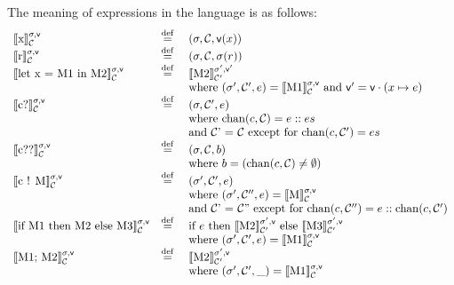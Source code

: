 \documentclass{article}
\newcommand{\m}[1]{\ensuremath{\llbracket #1\rrbracket}}
\begin{document}
The meaning of expressions in the language is as follows:
\[
\begin{array}{lcl}
  \m{\text{x}}^{\state, \envir}_\channels &\defn{} & (\state, \channels, \envir(x))\\
  \m{\text{r}}^{\state, \envir}_\channels &\defn{} & (\state, \channels, \state(r))\\
  \m{\text{let x = M1 in M2}}^{\state, \envir}_\channels & \defn{} &
  \m{\text{M2}}^{\state', \envir'}_{\channels'} \\
  && \text{where $(\state', \channels', e) = \m{\text{M1}}^{\state,
  \envir}_{\channels}$ and $\envir' = \envir \cdot (x \mapsto e)$} \\

  \m{\text{c?}}^{\state, \envir}_\channels & \defn{} &
    (\state, \channels', e)\\
    && \text{where $\mathrm{chan}(c, \channels) = e :: es$}\\
    && \text{and \channels' =
    \channels\ except for $\mathrm{chan}(c, \channels') = es$}\\

  \m{\text{c??}}^{\state, \envir}_\channels & \defn{} &
    (\state, \channels, b)\\
    && \text{where $b = (\mathrm{chan}(c, \channels) \neq \emptyset)$}\\

  \m{\text{c ! M}}^{\state, \envir}_\channels & \defn{} &
    (\state', \channels', e)\\
    && \text{where $(\state', \channels'', e) = \m{\text{M}}^{\state, \envir}_\channels$}\\
    && \text{and \channels' =
    \channels'' except for $\mathrm{chan}(c, \channels'') = e :: \mathrm{chan}(c, \channels')$}\\

  \m{\text{if M1 then M2 else M3}}^{\state, \envir}_\channels & \defn{} &
    \text{if $e$ then $\m{\text{M2}}^{\state', \envir}_{\channels'}$ else
    $\m{\text{M3}}^{\state', \envir}_{\channels'}$}\\
    && \text{where $(\state', \channels', e) = \m{\text{M1}}^{\state, \envir}_\channels$}\\

  \m{\text{M1; M2}}^{\state, \envir}_\channels & \defn{} &
    \m{\text{M2}}^{\state', \envir}_{\channels'}\\
    && \text{where $(\state', \channels', \_) = \m{\text{M1}}^{\state, \envir}_\channels$}\\


\end{array}\]
\end{document}
